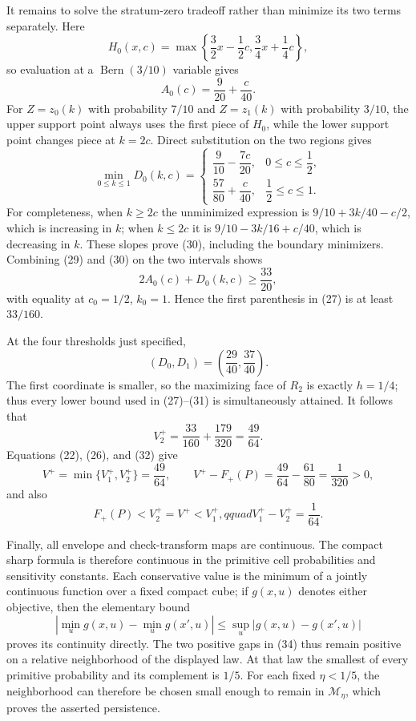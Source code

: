 It remains to solve the stratum-zero tradeoff rather than minimize its
two terms separately.  Here
\[
 H_0(x,c)=\max\left\{\frac32x-\frac12c,
                         \frac34x+\frac14c\right\},
\]
so evaluation at a \(\operatorname{Bern}(3/10)\) variable gives
\[
 A_0(c)=\frac9{20}+\frac{c}{40}.                               \tag{29}
\]
For \(Z=z_0(k)\) with probability \(7/10\) and \(Z=z_1(k)\) with
probability \(3/10\), the upper support point always uses the first
piece of \(H_0\), while the lower support point changes piece at
\(k=2c\).  Direct substitution on the two regions gives
\[
 \min_{0\leq k\leq1}D_0(k,c)=
 \begin{cases}
 \dfrac9{10}-\dfrac{7c}{20},&0\leq c\leq\dfrac12,\\[2mm]
 \dfrac{57}{80}+\dfrac{c}{40},&\dfrac12\leq c\leq1.
 \end{cases}                                                   \tag{30}
\]
For completeness, when \(k\geq2c\) the unminimized expression is
\(9/10+3k/40-c/2\), which is increasing in \(k\); when
\(k\leq2c\) it is \(9/10-3k/16+c/40\), which is decreasing in
\(k\).  These slopes prove (30), including the boundary minimizers.
Combining (29) and (30) on the two intervals shows
\[
 2A_0(c)+D_0(k,c)\geq\frac{33}{20},                            \tag{31}
\]
with equality at \(c_0=1/2\), \(k_0=1\).  Hence the first
parenthesis in (27) is at least \(33/160\).

At the four thresholds just specified,
\[
 (D_0,D_1)=\left(\frac{29}{40},\frac{37}{40}\right).
\]
The first coordinate is smaller, so the maximizing face of \(R_2\)
is exactly \(h=1/4\); thus every lower bound used in (27)--(31) is
simultaneously attained.  It follows that
\[
 V_2^+=\frac{33}{160}+\frac{179}{320}=\frac{49}{64}.            \tag{32}
\]
Equations (22), (26), and (32) give
\[
 V^+=\min\{V_1^+,V_2^+\}=\frac{49}{64},\qquad
 V^+-F_+(P)=\frac{49}{64}-\frac{61}{80}=\frac1{320}>0,         \tag{33}
\]
and also
\[
 F_+(P)<V_2^+=V^+<V_1^+,qquad V_1^+-V_2^+=\frac1{64}.          \tag{34}
\]

Finally, all envelope and check-transform maps are continuous.  The
compact sharp formula is therefore continuous in the primitive cell
probabilities and sensitivity constants.  Each conservative value is
the minimum of a jointly continuous function over a fixed compact cube;
if \(g(x,u)\) denotes either objective, then the elementary bound
\[
 \left|\min_u g(x,u)-\min_u g(x',u)\right|
 \leq\sup_u|g(x,u)-g(x',u)|
\]
proves its continuity directly.  The two positive gaps in (34) thus
remain positive on a relative neighborhood of the displayed law.  At
that law the smallest of every primitive probability and its complement
is \(1/5\).  For each fixed \(\eta<1/5\), the neighborhood can therefore
be chosen small enough to remain in \(\mathcal M_\eta\), which proves
the asserted persistence.

